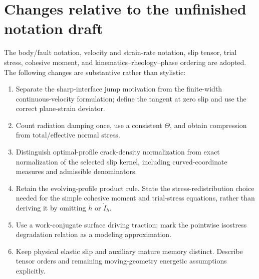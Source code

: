 \documentclass[10pt,letterpaper]{article}
\begin{document}
\clearpage
\section*{Changes relative to the unfinished notation draft}
The body/fault notation, velocity and strain-rate notation, slip tensor, trial stress, cohesive moment, and kinematics--rheology--phase ordering are adopted. The following changes are substantive rather than stylistic:
\begin{enumerate}
\item Separate the sharp-interface jump motivation from the finite-width continuous-velocity formulation; define the tangent at zero slip and use the correct plane-strain deviator.
\item Count radiation damping once, use a consistent $\Theta$, and obtain compression from total/effective normal stress.
\item Distinguish optimal-profile crack-density normalization from exact normalization of the selected slip kernel, including curved-coordinate measures and admissible denominators.
\item Retain the evolving-profile product rule. State the stress-redistribution choice needed for the simple cohesive moment and trial-stress equations, rather than deriving it by omitting $\dot h$ or $\dot I_h$.
\item Use a work-conjugate surface driving traction; mark the pointwise isostress degradation relation as a modeling approximation.
\item Keep physical elastic slip and auxiliary mature memory distinct. Describe tensor orders and remaining moving-geometry energetic assumptions explicitly.
\end{enumerate}
\end{document}
